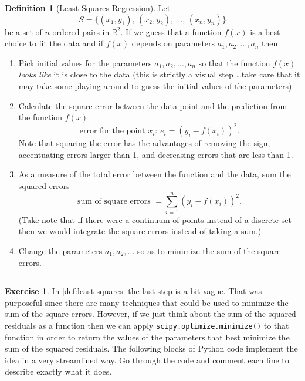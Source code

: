 \documentclass[
]{book}
\theoremstyle{definition}
\newtheorem{definition}{Definition}[chapter]
\theoremstyle{definition}
\theoremstyle{definition}
\newtheorem{exercise}{Exercise}[chapter]
\theoremstyle{remark}
\begin{document}
\begin{definition}[Least Squares Regression]
\protect\hypertarget{def:least-squares}{}{\label{def:least-squares} {} }Let
\[S = \{ (x_1, y_1), \, (x_2, y_2), \, \ldots, \, (x_n, y_n) \}\] be a
set of \(n\) ordered pairs in \(\mathbb{R}^2\). If we guess that a function
\(f(x)\) is a best choice to fit the data and if \(f(x)\) depends on
parameters \(a_1, a_2, \ldots, a_n\) then

\begin{enumerate}
\def\labelenumi{\alph{enumi}.}
\item
  Pick initial values for the parameters \(a_1, a_2, \ldots, a_n\) so that
  the function \(f(x)\) \emph{looks like} it is close to the data (this is
  strictly a visual step \ldots take care that it may take some playing
  around to guess the initial values of the parameters)
\item
  Calculate the square error between the data point and the prediction
  from the function \(f(x)\)
  \[\text{error for the point $x_i$: } e_i = \left( y_i - f(x_i) \right)^2.\]
  Note that squaring the error has the advantages of removing the
  sign, accentuating errors larger than 1, and decreasing errors that
  are less than 1.
\item
  As a measure of the total error between the function and the data,
  sum the squared errors
  \[\text{sum of square errors } = \sum_{i=1}^n \left( y_i - f(x_i) \right)^2.\]
  (Take note that if there were a continuum of points instead of a
  discrete set then we would integrate the square errors instead of
  taking a sum.)
\item
  Change the parameters \(a_1, a_2, \ldots\) so as to minimize the sum
  of the square errors.
\end{enumerate}
\end{definition}

\begin{center}\rule{0.5\linewidth}{0.5pt}\end{center}

\begin{exercise}
\protect\hypertarget{exr:unnamed-chunk-243}{}{\label{exr:unnamed-chunk-243} }In \ref{def:least-squares} the last step is a bit vague. That was purposeful since there are many techniques that could be used to minimize the sum of the square errors. However, if we just think about the sum of the squared residuals as a function then we can apply \texttt{scipy.optimize.minimize()} to that function in order to return the values of the parameters that best minimize the sum of the squared residuals. The following blocks of Python code implement the idea in a very streamlined way. Go through the code and comment each line to describe exactly what it does.
\end{exercise}
\end{document}
